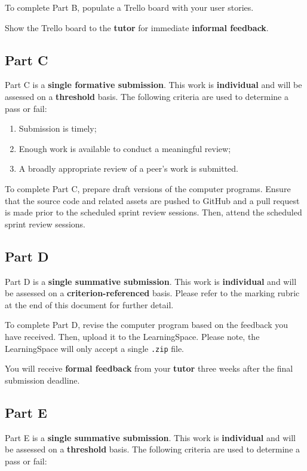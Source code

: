 \documentclass{../../fal_assignment}
\begin{document}
To complete Part B, populate a Trello board with your user stories.

Show the Trello board to the \textbf{tutor} for immediate \textbf{informal feedback}.

\subsection*{Part C}

Part C is a \textbf{single formative submission}. This work is \textbf{individual} and will be assessed on a \textbf{threshold} basis. The following criteria are used to determine a pass or fail:

\begin{enumerate}[label=(\alph*)]
	\item Submission is timely;
	\item Enough work is available to conduct a meaningful review;
	\item A broadly appropriate review of a peer's work is submitted.
\end{enumerate}

To complete Part C, prepare draft versions of the computer programs. Ensure that the source code and related assets are pushed to GitHub and a pull request is made prior to the scheduled sprint review sessions. Then, attend the scheduled sprint review sessions.

\subsection*{Part D}

Part D is a \textbf{single summative submission}. This work is \textbf{individual} and will be assessed on a \textbf{criterion-referenced} basis. Please refer to the marking rubric at the end of this document for further detail.

To complete Part D, revise the computer program based on the feedback you have received. Then, upload it to the LearningSpace. Please note, the LearningSpace will only accept a single \texttt{.zip} file.

You will receive \textbf{formal feedback} from your \textbf{tutor} three weeks after the final submission deadline.

\subsection*{Part E}

Part E is a \textbf{single summative submission}. This work is \textbf{individual} and will be assessed on a \textbf{threshold} basis.  The following criteria are used to determine a pass or fail:
\end{document}
